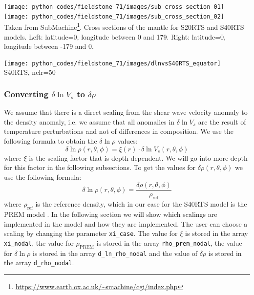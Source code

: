 \begin{center}
\texttt{[image: python\_codes/fieldstone\_71/images/sub\_cross\_section\_01]}
\texttt{[image: python\_codes/fieldstone\_71/images/sub\_cross\_section\_02]}\\
{\captionfont Taken from SubMachine\footnote{\url{https://www.earth.ox.ac.uk/~smachine/cgi/index.php}}.
Cross sections of the mantle for S20RTS and S40RTS models. 
Left: latitude=0, longitude between 0 and 179.
Right: latitude=0, longitude between -179 and 0.}
\end{center}

\begin{center}
\texttt{[image: python\_codes/fieldstone\_71/images/dlnvsS40RTS\_equator]}\\
{\captionfont S40RTS, nelr=50}
\end{center}


\subsubsection*{Converting $\delta \ln V_s$ to $\delta \rho$}

We assume that there is a direct scaling from the shear wave velocity anomaly to the density anomaly, i.e. 
we assume that all anomalies in $\delta \ln{V_s}$ are the result of temperature perturbations and 
not of differences in composition. 
We use the following formula to obtain the $\delta \ln{\rho} $ values:
\[
\delta \ln{\rho(r, \theta, \phi)} = \xi(r) \cdot \delta \ln{V_s(r, \theta, \phi)} 
\]
where $\xi$ is the scaling factor that is depth dependent. We will go into more depth for this factor in the following subsections. To get the values for $\delta \rho(r, \theta, \phi)$ we use the following formula:
\[
\delta \ln{\rho(r, \theta, \phi)} = \frac{\delta \rho(r, \theta,\phi)}{\rho_\text{ref}} 
\]
where $\rho_\text{ref}$ is the reference density, which in our case for the S40RTS model is the PREM model 
\cite{dzan81}. In the following section we will show which scalings are implemented in the model and how 
they are implemented. The user can choose a scaling by changing the parameter \texttt{xi\_case}. 
The value for $\xi$ is stored in the array \texttt{xi\_nodal}, 
the value for $\rho_\text{PREM}$ is stored in the array \texttt{rho\_prem\_nodal}, 
the value for $\delta \ln{\rho}$ is stored in the array \texttt{d\_ln\_rho\_nodal} 
and the value of $\delta \rho$ is stored in the array \texttt{d\_rho\_nodal}.

